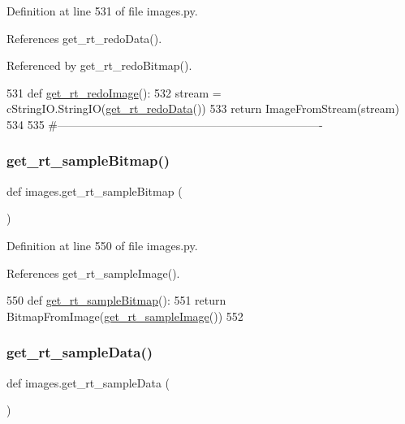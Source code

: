 Definition at line 531 of file images.\+py.



References get\+\_\+rt\+\_\+redo\+Data().



Referenced by get\+\_\+rt\+\_\+redo\+Bitmap().


\begin{DoxyCode}
531 \textcolor{keyword}{def }\hyperlink{namespaceimages_ae6da2122e70516d8aa6ff0f4e4141ade}{get\_rt\_redoImage}():
532     stream = cStringIO.StringIO(\hyperlink{namespaceimages_a556fd7418509ce5167c7298675f08f76}{get\_rt\_redoData}())
533     \textcolor{keywordflow}{return} ImageFromStream(stream)
534 
535 \textcolor{comment}{#----------------------------------------------------------------------}
\end{DoxyCode}
\mbox{\label{namespaceimages_a2c3d2873dd88908c562257fc622df4c8}} 
\subsubsection{\texorpdfstring{get\+\_\+rt\+\_\+sample\+Bitmap()}{get\_rt\_sampleBitmap()}}
{\footnotesize\ttfamily def images.\+get\+\_\+rt\+\_\+sample\+Bitmap (\begin{DoxyParamCaption}{ }\end{DoxyParamCaption})}



Definition at line 550 of file images.\+py.



References get\+\_\+rt\+\_\+sample\+Image().


\begin{DoxyCode}
550 \textcolor{keyword}{def }\hyperlink{namespaceimages_a2c3d2873dd88908c562257fc622df4c8}{get\_rt\_sampleBitmap}():
551     \textcolor{keywordflow}{return} BitmapFromImage(\hyperlink{namespaceimages_a6adda47fb7faee6db520b6b0e6fbdac1}{get\_rt\_sampleImage}())
552 
\end{DoxyCode}
\mbox{\label{namespaceimages_aad3c19cd4a044581a21b4b44a2d51f64}} 
\subsubsection{\texorpdfstring{get\+\_\+rt\+\_\+sample\+Data()}{get\_rt\_sampleData()}}
{\footnotesize\ttfamily def images.\+get\+\_\+rt\+\_\+sample\+Data (\begin{DoxyParamCaption}{ }\end{DoxyParamCaption})}



